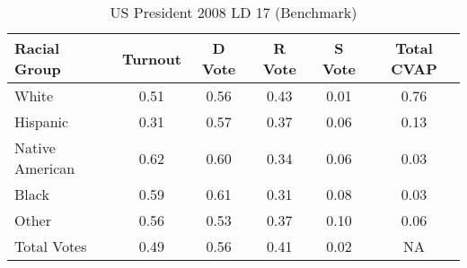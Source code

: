 \begin{table}[htb]
\begin{center}
\caption{US President 2008 LD 17 (Benchmark)}
\label{pres08_cvap_ld_17_benchmark}
\begin{tabular}{lccccc}
  \hline
Racial Group & Turnout & D Vote & R Vote & S Vote & Total CVAP \\ 
  \hline
    White & 0.51  & 0.56  & 0.43  & 0.01  & 0.76 \\
    Hispanic & 0.31  & 0.57  & 0.37  & 0.06  & 0.13 \\
    Native American & 0.62  & 0.60  & 0.34  & 0.06  & 0.03 \\
    Black & 0.59  & 0.61  & 0.31  & 0.08  & 0.03 \\
    Other & 0.56  & 0.53  & 0.37  & 0.10  & 0.06 \\
    Total Votes & 0.49  & 0.56  & 0.41  & 0.02  &  NA \\
   \hline
\end{tabular}
\end{center}
\end{table}
